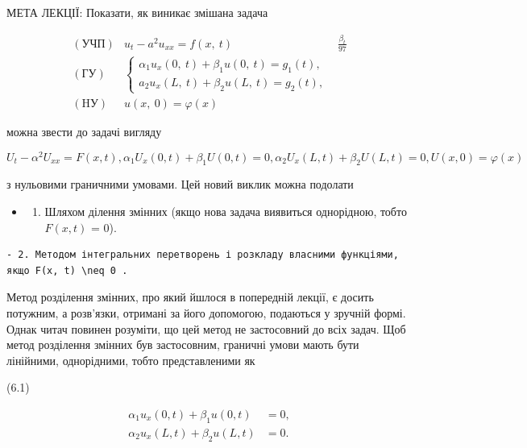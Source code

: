 \documentclass[
  ukrainian,
]{article}
\providecommand{\tightlist}{%
  \setlength{\itemsep}{0pt}\setlength{\parskip}{0pt}}
\begin{document}
МЕТА ЛЕКЦІЇ: Показати, як виникає змішана задача

\[
\begin{array}{lll} (\text{УЧП}) & u_t - a^2 u_{xx} = f\left(x, \ t\right) & \frac{\beta_t}{97} \\ (\text{ГУ}) & \begin{cases} \alpha_1 u_x\left(0, \ t\right) + \beta_1 u\left(0, \ t\right) = g_1\left(t\right), \\ a_2 u_x\left(L, \ t\right) + \beta_2 u\left(L, \ t\right) = g_2\left(t\right), \end{cases} \\ (\text{HУ}) & u\left(x, \ 0\right) = \varphi\left(x\right) \end{array}
\]

можна звести до задачі вигляду

\[
U_{t} - \alpha^{2}U_{xx} = F(x, t),
\alpha_{1}U_{x}(0, t) + \beta_{1}U(0, t) = 0,
\alpha_{2}U_{x}(L, t) + \beta_{2}U(L, t) = 0,
U(x, 0) = \varphi(x)
\]

з нульовими граничними умовами. Цей новий виклик можна подолати

\begin{itemize}
\tightlist
\item
  \begin{enumerate}
  \def\labelenumi{\arabic{enumi}.}
  \tightlist
  \item
    Шляхом ділення змінних (якщо нова задача виявиться однорідною, тобто
    \(F(x, t)\) = 0).
  \end{enumerate}
\end{itemize}

\begin{verbatim}
- 2. Методом інтегральних перетворень і розкладу власними функціями, якщо F(x, t) \neq 0 .
\end{verbatim}

Метод розділення змінних, про який йшлося в попередній лекції, є досить
потужним, а розв'язки, отримані за його допомогою, подаються у зручній
формі. Однак читач повинен розуміти, що цей метод не застосовний до всіх
задач. Щоб метод розділення змінних був застосовним, граничні умови
мають бути лінійними, однорідними, тобто представленими як

(6.1)

\[
\begin{aligned} \alpha_1 u_x(0, t) + \beta_1 u(0, t) &= 0, \\ \alpha_2 u_x(L, t) + \beta_2 u(L, t) &= 0. \end{aligned}
\]
\end{document}
